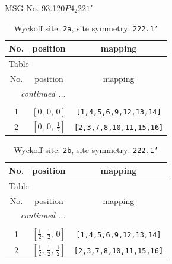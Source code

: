\documentclass[fleqn,8pt]{jsarticle}
\begin{document}
\setcounter{MaxMatrixCols}{32}

\renewcommand{\tablename}{Table~}
\renewcommand{\figurename}{Figure~}
\begin{center}
\LARGE
MSG No. 93.120\quad$P4_{2}221'$
\end{center}
\renewcommand{\arraystretch}{1.2}
\begin{longtable}{ccc}
\caption{Wyckoff site: {\tt 2a}, site symmetry: {\tt 222.1'}}
 \\
 \hline \hline
No. & position & mapping \\ \hline \endfirsthead

\multicolumn{2}{l}{\tablename\ \thetable{}} \\
 \hline \hline
No. & position & mapping \\ \hline \endhead

 \hline \hline
\multicolumn{2}{r}{\footnotesize\it continued ...} \\ \endfoot

 \hline \hline
\multicolumn{2}{r}{} \\ \endlastfoot

1 & $\left[ 0,\, 0,\, 0 \right]$ & {\tt [1,4,5,6,9,12,13,14]} \\ \hline
2 & $\left[ 0,\, 0,\, \frac{1}{2} \right]$ & {\tt [2,3,7,8,10,11,15,16]} \\
\end{longtable}
\renewcommand{\arraystretch}{1.2}
\begin{longtable}{ccc}
\caption{Wyckoff site: {\tt 2b}, site symmetry: {\tt 222.1'}}
 \\
 \hline \hline
No. & position & mapping \\ \hline \endfirsthead

\multicolumn{2}{l}{\tablename\ \thetable{}} \\
 \hline \hline
No. & position & mapping \\ \hline \endhead

 \hline \hline
\multicolumn{2}{r}{\footnotesize\it continued ...} \\ \endfoot

 \hline \hline
\multicolumn{2}{r}{} \\ \endlastfoot

1 & $\left[ \frac{1}{2},\, \frac{1}{2},\, 0 \right]$ & {\tt [1,4,5,6,9,12,13,14]} \\ \hline
2 & $\left[ \frac{1}{2},\, \frac{1}{2},\, \frac{1}{2} \right]$ & {\tt [2,3,7,8,10,11,15,16]} \\
\end{longtable}
\end{document}
